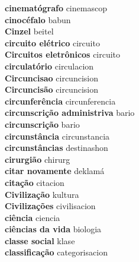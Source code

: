\textbf{ cinematógrafo  } cinemascop \\
\textbf{ cinocéfalo  } babun \\
\textbf{ Cinzel  } beitel \\
\textbf{ circuito elétrico  } circuito \\
\textbf{ Circuitos eletrônicos  } circuito \\
\textbf{ circulatório  } circulacion \\
\textbf{ Circuncisao  } circuncision \\
\textbf{ Circuncisão  } circuncision \\
\textbf{ circunferência  } circunferencia \\
\textbf{ circunscrição administriva  } bario \\
\textbf{ circunscrição  } bario \\
\textbf{ circunstância  } circunstancia \\
\textbf{ circunstâncias  } destinashon \\
\textbf{ cirurgião  } chirurg \\
\textbf{ citar novamente  } deklamá \\
\textbf{ citação  } citacion \\
\textbf{ Civilização  } kultura \\
\textbf{ Civilizações  } civilisacion \\
\textbf{ ciência  } ciencia \\
\textbf{ ciências da vida  } biologia \\
\textbf{ classe social  } klase \\
\textbf{ classificação  } categorisacion \\
